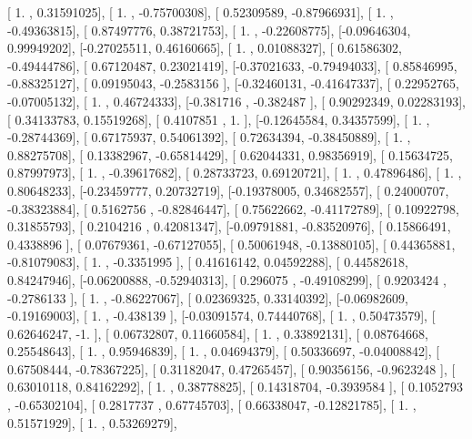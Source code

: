 \documentclass{article}
\begin{document}
       [ 1.        ,  0.31591025],
       [ 1.        , -0.75700308],
       [ 0.52309589, -0.87966931],
       [ 1.        , -0.49363815],
       [ 0.87497776,  0.38721753],
       [ 1.        , -0.22608775],
       [-0.09646304,  0.99949202],
       [-0.27025511,  0.46160665],
       [ 1.        ,  0.01088327],
       [ 0.61586302, -0.49444786],
       [ 0.67120487,  0.23021419],
       [-0.37021633, -0.79494033],
       [ 0.85846995, -0.88325127],
       [ 0.09195043, -0.2583156 ],
       [-0.32460131, -0.41647337],
       [ 0.22952765, -0.07005132],
       [ 1.        ,  0.46724333],
       [-0.381716  , -0.382487  ],
       [ 0.90292349,  0.02283193],
       [ 0.34133783,  0.15519268],
       [ 0.4107851 ,  1.        ],
       [-0.12645584,  0.34357599],
       [ 1.        , -0.28744369],
       [ 0.67175937,  0.54061392],
       [ 0.72634394, -0.38450889],
       [ 1.        ,  0.88275708],
       [ 0.13382967, -0.65814429],
       [ 0.62044331,  0.98356919],
       [ 0.15634725,  0.87997973],
       [ 1.        , -0.39617682],
       [ 0.28733723,  0.69120721],
       [ 1.        ,  0.47896486],
       [ 1.        ,  0.80648233],
       [-0.23459777,  0.20732719],
       [-0.19378005,  0.34682557],
       [ 0.24000707, -0.38323884],
       [ 0.5162756 , -0.82846447],
       [ 0.75622662, -0.41172789],
       [ 0.10922798,  0.31855793],
       [ 0.2104216 ,  0.42081347],
       [-0.09791881, -0.83520976],
       [ 0.15866491,  0.4338896 ],
       [ 0.07679361, -0.67127055],
       [ 0.50061948, -0.13880105],
       [ 0.44365881, -0.81079083],
       [ 1.        , -0.3351995 ],
       [ 0.41616142,  0.04592288],
       [ 0.44582618,  0.84247946],
       [-0.06200888, -0.52940313],
       [ 0.296075  , -0.49108299],
       [ 0.9203424 , -0.2786133 ],
       [ 1.        , -0.86227067],
       [ 0.02369325,  0.33140392],
       [-0.06982609, -0.19169003],
       [ 1.        , -0.438139  ],
       [-0.03091574,  0.74440768],
       [ 1.        ,  0.50473579],
       [ 0.62646247, -1.        ],
       [ 0.06732807,  0.11660584],
       [ 1.        ,  0.33892131],
       [ 0.08764668,  0.25548643],
       [ 1.        ,  0.95946839],
       [ 1.        ,  0.04694379],
       [ 0.50336697, -0.04008842],
       [ 0.67508444, -0.78367225],
       [ 0.31182047,  0.47265457],
       [ 0.90356156, -0.9623248 ],
       [ 0.63010118,  0.84162292],
       [ 1.        ,  0.38778825],
       [ 0.14318704, -0.3939584 ],
       [ 0.1052793 , -0.65302104],
       [ 0.2817737 ,  0.67745703],
       [ 0.66338047, -0.12821785],
       [ 1.        ,  0.51571929],
       [ 1.        ,  0.53269279],
\end{document}
